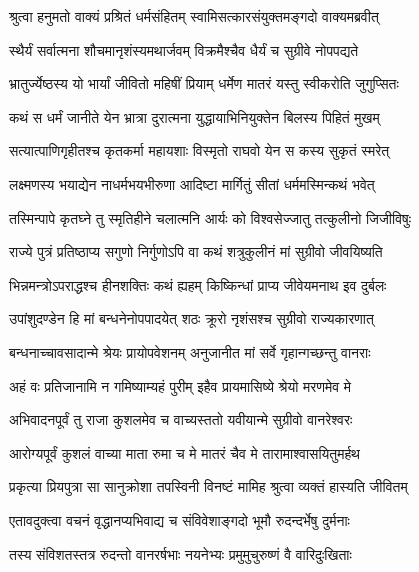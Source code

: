 
\twolineshloka
{श्रुत्वा हनुमतो वाक्यं प्रश्रितं धर्मसंहितम्}
{स्वामिसत्कारसंयुक्तमङ्गदो वाक्यमब्रवीत्} %

\twolineshloka
{स्थैर्यं सर्वात्मना शौचमानृशंस्यमथार्जवम्}
{विक्रमैश्चैव धैर्यं च सुग्रीवे नोपपद्यते} %

\twolineshloka
{भ्रातुर्ज्येष्ठस्य यो भार्यां जीवितो महिषीं प्रियाम्}
{धर्मेण मातरं यस्तु स्वीकरोति जुगुप्सितः} %

\twolineshloka
{कथं स धर्मं जानीते येन भ्रात्रा दुरात्मना}
{युद्धायाभिनियुक्तेन बिलस्य पिहितं मुखम्} %

\twolineshloka
{सत्यात्पाणिगृहीतश्च कृतकर्मा महायशाः}
{विस्मृतो राघवो येन स कस्य सुकृतं स्मरेत्} %

\twolineshloka
{लक्ष्मणस्य भयाद्येन नाधर्मभयभीरुणा}
{आदिष्टा मार्गितुं सीतां धर्ममस्मिन्कथं भवेत्} %

\twolineshloka
{तस्मिन्पापे कृतघ्ने तु स्मृतिहीने चलात्मनि}
{आर्यः को विश्वसेज्जातु तत्कुलीनो जिजीविषुः} %

\twolineshloka
{राज्ये पुत्रं प्रतिष्ठाप्य सगुणो निर्गुणोऽपि वा}
{कथं शत्रुकुलीनं मां सुग्रीवो जीवयिष्यति} %

\twolineshloka
{भिन्नमन्त्रोऽपराद्धश्च हीनशक्तिः कथं ह्यहम्}
{किष्किन्धां प्राप्य जीवेयमनाथ इव दुर्बलः} %

\twolineshloka
{उपांशुदण्डेन हि मां बन्धनेनोपपादयेत्}
{शठः क्रूरो नृशंसश्च सुग्रीवो राज्यकारणात्} %

\twolineshloka
{बन्धनाच्चावसादान्मे श्रेयः प्रायोपवेशनम्}
{अनुजानीत मां सर्वे गृहान्गच्छन्तु वानराः} %

\twolineshloka
{अहं वः प्रतिजानामि न गमिष्याम्यहं पुरीम्}
{इहैव प्रायमासिष्ये श्रेयो मरणमेव मे} %

\twolineshloka
{अभिवादनपूर्वं तु राजा कुशलमेव च}
{वाच्यस्ततो यवीयान्मे सुग्रीवो वानरेश्वरः} %

\twolineshloka
{आरोग्यपूर्वं कुशलं वाच्या माता रुमा च मे}
{मातरं चैव मे तारामाश्वासयितुमर्हथ} %

\twolineshloka
{प्रकृत्या प्रियपुत्रा सा सानुक्रोशा तपस्विनी}
{विनष्टं मामिह श्रुत्वा व्यक्तं हास्यति जीवितम्} %

\twolineshloka
{एतावदुक्त्वा वचनं वृद्धानप्यभिवाद्य च}
{संविवेशाङ्गदो भूमौ रुदन्दर्भेषु दुर्मनाः} %

\twolineshloka
{तस्य संविशतस्तत्र रुदन्तो वानरर्षभाः}
{नयनेभ्यः प्रमुमुचुरुष्णं वै वारिदुःखिताः} %

